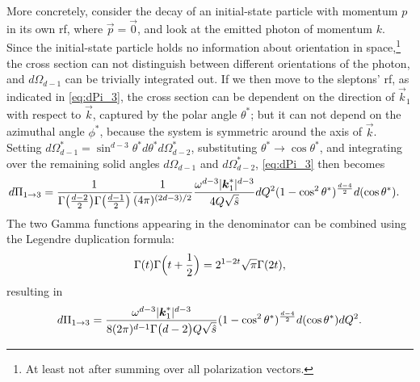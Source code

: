 More concretely, consider the decay of an initial-state particle with momentum $p$ in its own \gls{rf}, where $\vec{p}=\vec{0}$, and look at the emitted photon of momentum $k$. Since the initial-state particle holds no information about orientation in space,\footnote{At least not after summing over all polarization vectors.} the cross section can not distinguish between different orientations of the photon, and $d\Omega_{d-1}$ can be trivially integrated out.
If we then move to the sleptons' \gls{rf}, as indicated in \cref{eq:dPi_3}, the cross section can be dependent on the direction of $\vec{k}_1$ with respect to $\vec{k}$, captured by the polar angle $\theta^*$; but it can not depend on the azimuthal angle $\phi^*$, because the system is symmetric around the axis of $\vec{k}$.
Setting $d\Omega_{d-1}^* = \sin^{d-3}\theta^* d\theta^* d\Omega_{d-2}^*$, substituting $\theta^*\to\cos\theta^*$, and integrating over the remaining solid angles $d\Omega_{d-1}$ and $d\Omega_{d-2}^*$, \cref{eq:dPi_3} then becomes
\begin{align}
    d\Pi_{1\to3} &=
    \frac{1}{\Gamma\bigl(\frac{d-2}{2}\bigr)\Gamma\bigl(\frac{d-1}{2}\bigr)}
    \frac{1}{(4\pi)^{(2d-3)/2}} \frac{\omega^{d-3}\lvert\boldsymbol{k}_1^*\rvert^{d-3}}{4Q\sqrt{\hat{s}}} dQ^2 (1-\cos^2\theta^*)^{\frac{d-4}{2}} d(\cos\theta^*).
\end{align}
The two Gamma functions appearing in the denominator can be combined using the Legendre duplication formula:
\begin{equation}
    \Gamma(t)\Gamma\Bigl( t + \frac{1}{2} \Bigr) = 2^{1-2t} \sqrt{\pi} \Gamma(2t),
    \label{eq:legendre_duplication}
\end{equation}
resulting in
\begin{equation}
    d\Pi_{1\to3} =
    \frac{\omega^{d-3}\lvert\boldsymbol{k}_1^*\rvert^{d-3}}{8(2\pi)^{d-1} \Gamma\bigl( d-2 \bigr) Q\sqrt{\hat{s}}} (1-\cos^2\theta^*)^{\frac{d-4}{2}} d(\cos\theta^*) dQ^2.
    \label{eq:dPi_13_before_x}
\end{equation}

